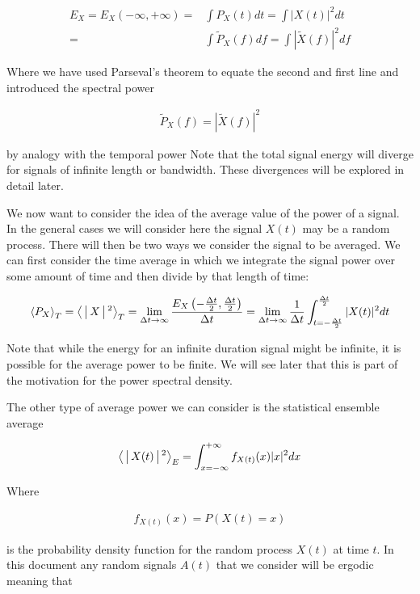 \documentclass[12pt]{article}
\begin{document}
\begin{align}
E_X = E_X(-\infty, +\infty) =& \int P_X(t) dt = \int |X(t)|^2 dt\\
=& \int \tilde{P}_X(f)df = \int |\tilde{X}(f)|^2 df
\end{align}

Where we have used Parseval's theorem to equate the second and first line and introduced the spectral power

\begin{align}
\tilde{P}_X(f) = |\tilde{X}(f)|^2
\end{align}

by analogy with the temporal power
Note that the total signal energy will diverge for signals of infinite length or bandwidth.
These divergences will be explored in detail later.

We now want to consider the idea of the average value of the power of a signal. 
In the general cases we will consider here the signal $X(t)$ may be a random process.
There will then be two ways we consider the signal to be averaged.
We can first consider the time average in which we integrate the signal power over some amount of time and then divide by that length of time:

\begin{align}
\Braket{P_X}_T = \Braket{|X|^2}_T = \lim_{\Delta t \rightarrow \infty} \frac{E_X\left(-\frac{\Delta t}{2}, \frac{\Delta t}{2}\right)}{\Delta t}= \lim_{\Delta t \rightarrow \infty} \frac{1}{\Delta t}\int_{t=-\frac{\Delta t}{2}}^{\frac{\Delta t}{2}} |X(t)|^2 dt
\end{align}
 
Note that while the energy for an infinite duration signal might be infinite, it is possible for the average power to be finite. 
We will see later that this is part of the motivation for the power spectral density.

The other type of average power we can consider is the statistical ensemble average

\begin{align}
\Braket{|X(t)|^2}_E = \int_{x=-\infty}^{+\infty} f_{X(t)}(x) |x|^2 dx
\end{align}

Where

\begin{align}
f_{X(t)}(x) = P(X(t)=x)
\end{align}

is the probability density function for the random process $X(t)$ at time $t$.
In this document any random signals $A(t)$ that we consider will be ergodic meaning that
\end{document}
